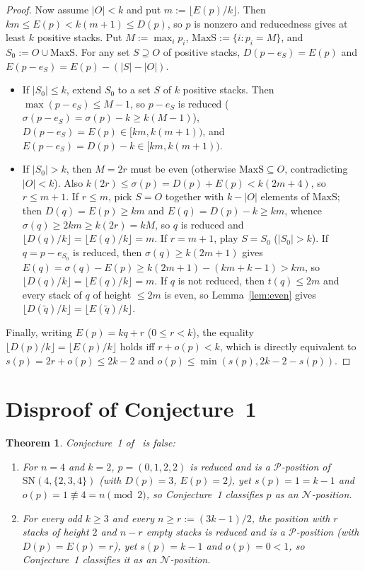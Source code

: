 \documentclass[11pt]{article}
\newtheorem{theorem}{Theorem}
\begin{document}
\begin{proof}
Now assume $|O| < k$ and put $m := \lfloor E(p)/k \rfloor$. Then
$k m \le E(p) < k(m + 1) \le D(p)$, so $p$ is nonzero and reducedness gives at
least $k$ positive stacks. Put $M := \max_i p_i$,
$\mathrm{MaxS} := \{i : p_i = M\}$, and $S_0 := O \cup \mathrm{MaxS}$. For any
set $S \supseteq O$ of positive stacks, $D(p - e_S) = E(p)$ and
$E(p - e_S) = E(p) - (|S| - |O|)$.
\begin{itemize}
\item If $|S_0| \le k$, extend $S_0$ to a set $S$ of $k$ positive stacks. Then
$\max(p - e_S) \le M - 1$, so $p - e_S$ is reduced
($\sigma(p - e_S) = \sigma(p) - k \ge k(M - 1)$), $D(p - e_S) = E(p) \in [k m, k(m + 1))$,
and $E(p - e_S) = D(p) - k \in [k m, k(m + 1))$.
\item If $|S_0| > k$, then $M = 2r$ must be even (otherwise
$\mathrm{MaxS} \subseteq O$, contradicting $|O| < k$). Also
$k(2r) \le \sigma(p) = D(p) + E(p) < k(2m + 4)$, so $r \le m + 1$.
If $r \le m$, pick $S = O$ together with $k - |O|$ elements of $\mathrm{MaxS}$;
then $D(q) = E(p) \ge k m$ and $E(q) = D(p) - k \ge k m$, whence
$\sigma(q) \ge 2k m \ge k(2r) = k M$, so $q$ is reduced and
$\lfloor D(q)/k \rfloor = \lfloor E(q)/k \rfloor = m$.
If $r = m + 1$, play $S = S_0$ ($|S_0| > k$). If $q = p - e_{S_0}$ is reduced,
then $\sigma(q) \ge k(2m + 1)$ gives
$E(q) = \sigma(q) - E(p) \ge k(2m + 1) - (k m + k - 1) > k m$, so
$\lfloor D(q)/k \rfloor = \lfloor E(q)/k \rfloor = m$. If $q$ is not reduced,
then $t(q) \le 2m$ and every stack of $q$ of height $\le 2m$ is even, so
Lemma~\ref{lem:even} gives
$\lfloor D(\tilde q)/k \rfloor = \lfloor E(\tilde q)/k \rfloor$.
\end{itemize}
Finally, writing $E(p) = k q + r$ ($0 \le r < k$), the equality
$\lfloor D(p)/k \rfloor = \lfloor E(p)/k \rfloor$ holds iff $r + o(p) < k$,
which is directly equivalent to $s(p) = 2r + o(p) \le 2k - 2$ and
$o(p) \le \min(s(p), 2k - 2 - s(p))$.
\end{proof}

\section{Disproof of Conjecture~1}

\begin{theorem}\label{thm:disproof}
Conjecture~1 of~\cite{DH2026} is false:
\begin{enumerate}
\item For $n = 4$ and $k = 2$, $p = (0, 1, 2, 2)$ is reduced and is a
$\mathcal{P}$-position of $\mathrm{SN}(4, \{2, 3, 4\})$ (with $D(p) = 3$,
$E(p) = 2$), yet $s(p) = 1 = k - 1$ and $o(p) = 1 \not\equiv 4 = n \pmod 2$,
so Conjecture~1 classifies $p$ as an $\mathcal{N}$-position.
\item For every odd $k \ge 3$ and every $n \ge r := (3k - 1)/2$, the position
with $r$ stacks of height $2$ and $n - r$ empty stacks is reduced and is a
$\mathcal{P}$-position (with $D(p) = E(p) = r$), yet $s(p) = k - 1$ and
$o(p) = 0 < 1$, so Conjecture~1 classifies it as an $\mathcal{N}$-position.
\end{enumerate}
\end{theorem}
\end{document}
